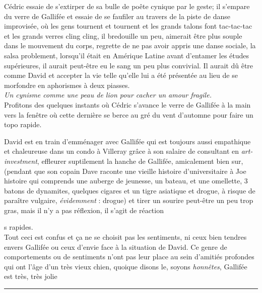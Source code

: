 \documentclass{article}
\begin{document}
Cédric essaie
de s'extirper de sa bulle de poête cynique par le geste; il s'empare du
verre de Gallifée et essaie de se faufiler au travers de la piste de danse
improvisée, où les gens tournent et tournent et les grands talons font
tac-tac-tac et les grands verres cling cling, il bredouille un peu, aimerait
être plus souple dans le mouvement du corps, regrette de ne pas avoir appris
une danse sociale, la salsa problement, lorsqu'il était en Amérique Latine
avant d'entamer les études supérieures, il aurait peut-être eu le sang un
peu plus convivial. Il aurait dû être comme David et accepter la vie telle
qu'elle lui a été présentée au lieu de se morfondre en aphorismes à deux
piasses.\\

\emph{Un cynisme comme une peau de lion pour cacher un amour fragile.}\\

Profitons des quelques instants où Cédric s'avance le verre de Gallifée à la
main vers la fenêtre où cette dernière se berce au gré du vent d'automne pour
faire un topo rapide.

David est en train d'emménager avec Gallifée qui est toujours aussi
empathique et chaleureuse dans un condo à Villeray grâce à son salaire de
consultant en \textit{art-investment}, effleurer suptilement la hanche de
Gallifée, amicalement bien sur, (pendant que son copain Dave raconte une
vieille histoire d'universitaire à Joe histoire qui comprends une auberge de
jeunesse, un bateau, et une omellette, 3 batons de dynamites, quelques
cigares et un tigre asiatique et drogue, à risque de paraître vulgaire,
\emph{évidemment} : drogue) et tirer un sourire peut-être un peu trop gras,
mais il n'y a pas réflexion, il s'agit de réaction

s rapides. \\

Tout ceci est confus et ça ne se choisit pas les sentiments, ni ceux bien
tendres envers Gallifée ou ceux d'envie face à la situation de David. Ce
genre de comportements ou de sentiments n'ont pas leur place au sein
d'amitiés profondes qui ont l'âge d'un très vieux chien, quoique disons le,
soyons \emph{honnêtes}, Gallifée est très, très jolie\\


\begin{center}\noindent\rule{0.5\textwidth}{0.4pt}\end{center}
\end{document}
